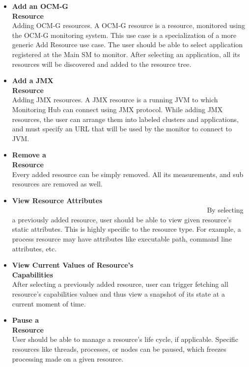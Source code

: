 \begin{itemize}
\item {\bf Add an OCM-G Resource}~~~~~~~~~~~~~~~~~~~~~~~~~~~~~~~~~~~~~~~~~~~~~~~~~~~~~~~~\linebreak
Adding OCM-G resources. A OCM-G resource is a resource, monitored using the OCM-G monitoring system. This use case is a specialization of a more generic Add Resource use case. The user should be able to select application registered at the Main SM to monitor. After selecting an application, all its resources will be discovered and added to the resource tree.

\item {\bf Add a JMX Resource}~~~~~~~~~~~~~~~~~~~~~~~~~~~~~~~~~~~~~~~~~~~~~~~~~~~~~~~~\linebreak
Adding JMX resources. A JMX resource is a running JVM to which Monitoring Hub can connect using JMX protocol. While adding JMX resources, the user can arrange them into labeled clusters and applications, and must specify an URL that will be used by the monitor to connect to JVM.

\item {\bf Remove a Resource}~~~~~~~~~~~~~~~~~~~~~~~~~~~~~~~~~~~~~~~~~~~~~~~~~~~~~~~~\linebreak
Every added resource can be simply removed. All its measurements, and sub resources are removed as well.

\item {\bf View Resource Attributes} ~~~~~~~~~~~~~~~~~~~~~~~~~~~~~~~~~~~~~~~~~~~~~~~~~~~~~~~~\linebreak
By selecting a previously added resource, user should be able to view given resource's static attributes. This is highly specific to the resource type. For example, a process resource may have attributes like executable path, command line attributes, etc.

\item {\bf View Current Values of Resource's
Capabilities}~~~~~~~~~~~~~~~~~~~~~~~~~~~~~~~~~~~~~~~~~~~~~~~~~~~~~~~~\linebreak
After selecting a previously added resource, user can trigger fetching all resource\rq{}s capabilities values and thus view a snapshot of its state at a current moment of time.

\item {\bf Pause a Resource}~~~~~~~~~~~~~~~~~~~~~~~~~~~~~~~~~~~~~~~~~~~~~~~~~~~~~~~~\linebreak
User should be able to manage a resource\rq{}s life cycle, if applicable. Specific resources like threads, processes, or nodes can be paused, which freezes processing made on a given resource.


\end{itemize}
